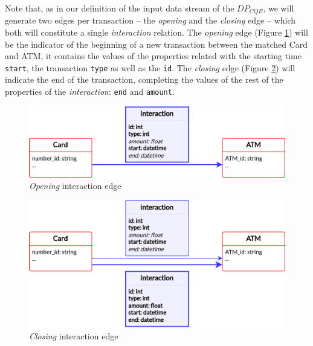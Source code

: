 Note that, as in our definition of the input data stream of the $DP_{CQE}$, we will generate two edges per transaction -- the \emph{opening} and the \emph{closing} edge -- which both will constitute a single \emph{interaction} relation. The \emph{opening} edge (Figure \ref{img:opening-edge}) will be the indicator of the beginning of a new transaction between the matched Card and ATM, it contains the values of the properties related with the starting time \texttt{start}, the transaction \texttt{type} as well as the \texttt{id}. The \emph{closing} edge (Figure \ref{img:closing-edge}) will indicate the end of the transaction, completing the values of the rest of the properties of the \emph{interaction}: \texttt{end} and \texttt{amount}.

\begin{figure}[h]
  \centering
  \includegraphics[scale = 0.8]{images/1-DataModel/2-edges-tx-tfm.png}
  \caption{\emph{Opening} interaction edge}
  \label{img:opening-edge}
\end{figure}

\begin{figure}[h]
  \centering
  \includegraphics[scale = 0.8]{images/1-DataModel/2-edges-tx-tfm-1.png}
  \caption{\emph{Closing} interaction edge}
  \label{img:closing-edge}
\end{figure}


